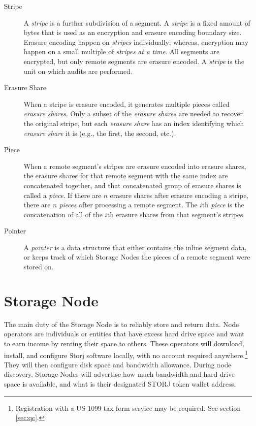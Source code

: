 \documentclass[8pt,fleqn,openany]{book}
\begin{document}
\begin{description}
\item[Stripe] A {\em stripe} is a further subdivision of a segment. A
{\em stripe} is a fixed amount of bytes that is used as an encryption and erasure
encoding boundary size. Erasure encoding happen on {\em stripes} individually;
whereas, encryption may happen on a small multiple of {\em stripes at a time}. All
segments are encrypted, but only remote segments are erasure encoded.
A {\em stripe} is the unit on which audits are performed.

\item[Erasure Share] When a stripe is erasure encoded, it generates
multiple pieces called {\em erasure shares}. Only a subset of the {\em erasure
shares} are needed to recover the original stripe, but each {\em erasure
share} has an index identifying which {\em erasure share} it is (e.g., the first,
the second, etc.).

\item[Piece] When a remote segment's stripes are erasure encoded into
erasure shares, the erasure shares for that remote segment with the
same index are concatenated together, and that concatenated group of erasure
shares is called a {\em piece}. If there are $n$ erasure shares after erasure
encoding a stripe, there are $n$ {\em pieces} after processing a remote
segment. The $i$th {\em piece} is the concatenation of all of the $i$th
erasure shares from that segment's stripes.

\item[Pointer] A {\em pointer} is a data structure that either contains the
inline segment data, or keeps track of which
Storage Nodes the pieces of a remote segment were stored on.
\end{description}

\section{Storage Node}\label{sec:concrete-storage-nodes}

The main duty of the Storage Node is to reliably store and return data.
Node operators
are individuals or entities that have excess hard drive space and want to earn
income by renting their space to others. These operators will
download,
install, and configure Storj software locally, with no account required
anywhere.\footnote{Registration with a US-1099 tax form service may be
required. See section \ref{sec:qc}.}
They will then configure disk space and bandwidth allowance.
During node discovery, Storage Nodes will advertise how much bandwidth and
hard drive space is available, and what is their designated STORJ token
wallet address.
\end{document}
